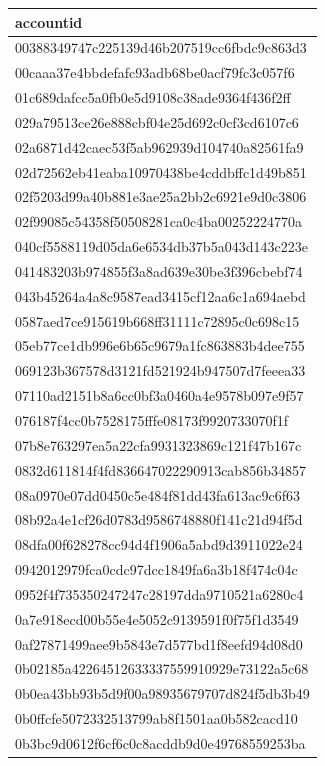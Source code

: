 \begin{tabular}{l}
\toprule
accountid \\
\midrule
00388349747c225139d46b207519cc6fbdc9c863d3 \\
00caaa37e4bbdefafc93adb68be0acf79fc3c057f6 \\
01c689dafcc5a0fb0e5d9108c38ade9364f436f2ff \\
029a79513ce26e888cbf04e25d692c0cf3cd6107c6 \\
02a6871d42caec53f5ab962939d104740a82561fa9 \\
02d72562eb41eaba10970438be4cddbffc1d49b851 \\
02f5203d99a40b881e3ae25a2bb2c6921e9d0c3806 \\
02f99085c54358f50508281ca0c4ba00252224770a \\
040cf5588119d05da6e6534db37b5a043d143c223e \\
041483203b974855f3a8ad639e30be3f396cbebf74 \\
043b45264a4a8c9587ead3415cf12aa6c1a694aebd \\
0587aed7ce915619b668ff31111c72895c0c698c15 \\
05eb77ce1db996e6b65c9679a1fc863883b4dee755 \\
069123b367578d3121fd521924b947507d7feeea33 \\
07110ad2151b8a6cc0bf3a0460a4e9578b097e9f57 \\
076187f4cc0b7528175fffe08173f9920733070f1f \\
07b8e763297ea5a22cfa9931323869c121f47b167c \\
0832d611814f4fd836647022290913cab856b34857 \\
08a0970e07dd0450c5e484f81dd43fa613ac9c6f63 \\
08b92a4e1cf26d0783d9586748880f141c21d94f5d \\
08dfa00f628278cc94d4f1906a5abd9d3911022e24 \\
0942012979fca0cdc97dcc1849fa6a3b18f474c04c \\
0952f4f735350247247c28197dda9710521a6280c4 \\
0a7e918ecd00b55e4e5052c9139591f0f75f1d3549 \\
0af27871499aee9b5843e7d577bd1f8eefd94d08d0 \\
0b02185a42264512633337559910929e73122a5c68 \\
0b0ea43bb93b5d9f00a98935679707d824f5db3b49 \\
0b0ffcfe5072332513799ab8f1501aa0b582cacd10 \\
0b3bc9d0612f6cf6c0c8acddb9d0e49768559253ba \\

\end{tabular}
